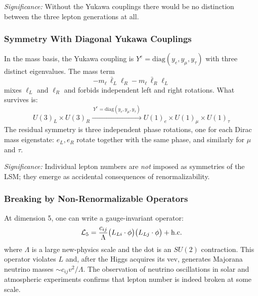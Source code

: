 \textit{Significance:} Without the Yukawa couplings there would be no
distinction between the three lepton generations at all.

\subsubsection*{Symmetry With Diagonal Yukawa Couplings}

In the mass basis, the Yukawa coupling is
$Y^e = \mathrm{diag}(y_e, y_\mu, y_\tau)$ with three distinct
eigenvalues. The mass term
\begin{equation*}
  -m_\ell\,\bar\ell_L\ell_R - m_\ell\,\bar\ell_R\ell_L
\end{equation*}
mixes $\ell_L$ and $\ell_R$ and forbids independent left and right
rotations. What survives is:
\begin{equation}
  \boxed{
    U(3)_L\times U(3)_R
    \xrightarrow{\ Y^e = \mathrm{diag}(y_e,y_\mu,y_\tau)\ }
    U(1)_e\times U(1)_\mu\times U(1)_\tau
  }
  \label{eq:lec19:yukawa-breaking}
\end{equation}
The residual symmetry is three independent phase rotations, one for
each Dirac mass eigenstate: $e_L,e_R$ rotate together with the same
phase, and similarly for $\mu$ and $\tau$.


\textit{Significance:} Individual lepton numbers are \emph{not} imposed
as symmetries of the LSM; they emerge as accidental consequences of
renormalizability.

\subsubsection*{Breaking by Non-Renormalizable Operators}

At dimension 5, one can write a gauge-invariant operator:
\begin{equation}
  \mathcal{L}_5 = \frac{c_{ij}}{\Lambda}
             \bigl(L_{Li}\cdot\phi\bigr)\bigl(L_{Lj}\cdot\phi\bigr)
             + \mathrm{h.c.}
  \label{eq:lec19:dim5}
\end{equation}
where $\Lambda$ is a large new-physics scale and the dot is an $SU(2)$
contraction. This operator violates $L$ and, after the Higgs acquires
its vev, generates Majorana neutrino masses $\sim c_{ij}v^2/\Lambda$.
The observation of neutrino oscillations in solar and atmospheric
experiments confirms that lepton number is indeed broken at some scale.

